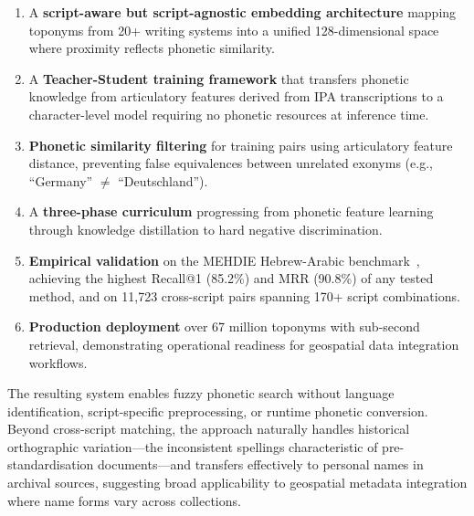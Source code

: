 \documentclass[11pt,a4paper]{article}
\newcommand{\embdim}{128}
\begin{document}
\begin{enumerate}
    \item A \textbf{script-aware but script-agnostic embedding architecture} mapping toponyms from 20+ writing systems into a unified \embdim-dimensional space where proximity reflects phonetic similarity.

    \item A \textbf{Teacher-Student training framework} that transfers phonetic knowledge from articulatory features derived from IPA transcriptions to a character-level model requiring no phonetic resources at inference time.

    \item \textbf{Phonetic similarity filtering} for training pairs using articulatory feature distance, preventing false equivalences between unrelated exonyms (e.g., ``Germany'' $\neq$ ``Deutschland'').

    \item A \textbf{three-phase curriculum} progressing from phonetic feature learning through knowledge distillation to hard negative discrimination.

    \item \textbf{Empirical validation} on the MEHDIE Hebrew-Arabic benchmark~\citep{mehdie2025}, achieving the highest Recall@1 (85.2\%) and MRR (90.8\%) of any tested method, and on 11,723 cross-script pairs spanning 170+ script combinations.

    \item \textbf{Production deployment} over 67 million toponyms with sub-second retrieval, demonstrating operational readiness for geospatial data integration workflows.
\end{enumerate}

The resulting system enables fuzzy phonetic search without language identification, script-specific preprocessing, or runtime phonetic conversion. Beyond cross-script matching, the approach naturally handles historical orthographic variation---the inconsistent spellings characteristic of pre-standardisation documents---and transfers effectively to personal names in archival sources, suggesting broad applicability to geospatial metadata integration where name forms vary across collections.
\end{document}
